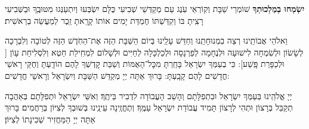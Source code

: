 \documentclass[twoside, openany, parskip=half, 11pt]{book}
\begin{document}
\begin{sometimes}
\textbf{יִשְׂמְחוּ בְמַלְכוּתְךָ}
שׁוֹמְרֵי שַׁבָּת וְקֽוֹרְאֵי עֹֽנֶג עַם מְקַדְּשֵׁי שְׁבִיעִי כֻּלָּם יִשְׂבְּעוּ וְיִתְעַנְּגוּ מִטּוּבֶֽךָ וּבַשְּׁבִיעִי רָצִֽיתָ בּוֹ וְקִדַּשְׁתּוֹ חֶמְדַּת יָמִים אוֹתוֹ קָרָֽאתָ זֵֽכֶר לְמַעֲשֵׂה בְרֵאשִׁית׃

 וֵאלֹהֵי אֲבוֹתֵֽינוּ רְצֵה בִמְנוּחָתֵֽנוּ וְחַדֵּשׁ עָלֵֽינוּ בְּיוֹם הַשַּׁבָּת הַזֶּה אֶת־הַחֹֽדֶשׁ הַזֶּה לְטוֹבָה וְלִבְרָכָה לְשָׂשׂוֹן וּלְשִׂמְחָה לִישׁוּעָה וּלְנֶחָמָה לְפַרְנָסָה וּלְכַלְכָּלָה לְחַיִּים וּלְשָׁלוֹם לִמְחִֽילַת חֵטְא וְלִסְלִיחַת עָוֹן [
וּלְכַפָּרַת פָּֽשַׁע]: כִּי בְעַמְּךָ יִשְׂרָאֵל בָּחַֽרְתָּ מִכׇּל־הָאֻמּוֹת וְשַׁבַּת קׇדְשְׁךָ לָהֶם הוֹדָֽעְתָּ וְחֻקֵּי רָאשֵׁי חֳדָשִׁים לָהֶם קָבָֽעְתָּ: בָּרוּךְ אַתָּה יְיָ מְקַדֵּשׁ הַשַּׁבָּת וְיִשְׂרָאֵל וְרָאשֵׁי חֳדָשִׁים: 

\end{sometimes}

יְיָ אֱלֹהֵֽינוּ בְּעַמְּךָ יִשְׂרָאֵל וּבִתְפִלָּתָם וְהָשֵׁב הָעֲבוֹדָה לִדְבִיר בֵּיתֶֽךָ׃ וְאִשֵּׁי יִשְׂרָאֵל וּתְפִלָּתָם בְּאַהֲבָה תְקַבֵּל בְּרָצוֹן וּתְהִי לְרָצוֹן תָּמִיד עֲבוֹדַת יִשְׂרָאֵל עַמֶּֽךָ׃ וְתֶחֱזֶֽינָה עֵינֵֽינוּ בְּשׁוּבְךָ לְצִיּוֹן בְּרַחֲמִים׃
בָּרוּךְ אַתָּה יְיָ הַמַּחֲזִיר שְׁכִינָתוֹ לְצִיּוֹן׃

\modim

\shabboschanukah

\shabboshodos

\vspace{.5\baselineskip}

\shatzbrikaskohanim

\shabbossimshalom


\tachanunim

\fullkaddish

\label{einkelokeinu}
\end{document}
